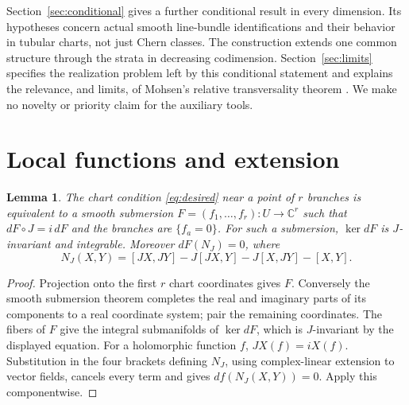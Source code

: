 \documentclass[11pt]{article}
\newtheorem{lemma}[theorem]{Lemma}
\theoremstyle{definition}
\theoremstyle{remark}
\newcommand{\C}{\mathbb C}
\begin{document}
Section~\ref{sec:conditional} gives a further conditional result in every dimension. Its hypotheses concern actual smooth line-bundle identifications and their behavior in tubular charts, not just Chern classes. The construction extends one common structure through the strata in decreasing codimension. Section~\ref{sec:limits} specifies the realization problem left by this conditional statement and explains the relevance, and limits, of Mohsen's relative transversality theorem \cite[p.~657]{Mohsen}. We make no novelty or priority claim for the auxiliary tools.

\section{Local functions and extension}\label{sec:local}

\begin{lemma}\label{lem:submersion}
The chart condition \eqref{eq:desired} near a point of $r$ branches is equivalent to a smooth submersion $F=(f_1,\ldots,f_r):U\to\C^r$ such that $dF\circ J=i\,dF$ and the branches are $\{f_a=0\}$. For such a submersion, $\ker dF$ is $J$-invariant and integrable. Moreover $dF(N_J)=0$, where
\[
 N_J(X,Y)=[JX,JY]-J[JX,Y]-J[X,JY]-[X,Y].
\]
\end{lemma}
\begin{proof}
Projection onto the first $r$ chart coordinates gives $F$. Conversely the smooth submersion theorem completes the real and imaginary parts of its components to a real coordinate system; pair the remaining coordinates. The fibers of $F$ give the integral submanifolds of $\ker dF$, which is $J$-invariant by the displayed equation.
For a holomorphic function $f$, $JX(f)=iX(f)$. Substitution in the four brackets defining $N_J$, using complex-linear extension to vector fields, cancels every term and gives $df(N_J(X,Y))=0$. Apply this componentwise.
\end{proof}

\end{document}
